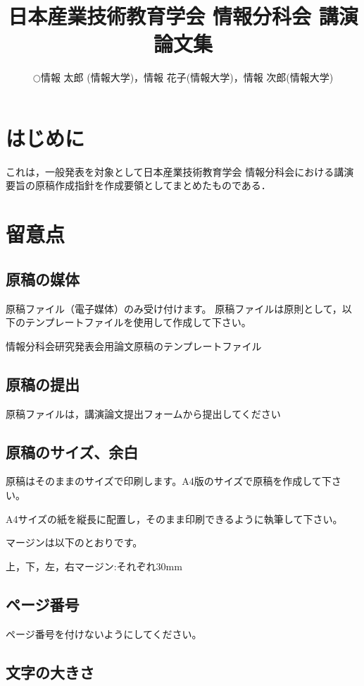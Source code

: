 \documentclass[uplatex, dvipdfmx]{jste-ist}
\title{日本産業技術教育学会 情報分科会 講演論文集}
\author{$\bigcirc$情報 太郎 (情報大学)，情報 花子(情報大学)，情報 次郎(情報大学)}
\begin{document}

\maketitle

\section{はじめに}

これは，一般発表を対象として日本産業技術教育学会 情報分科会における講演要旨の原稿作成指針を作成要領としてまとめたものである．

\section{留意点}

\subsection{原稿の媒体}

原稿ファイル（電子媒体）のみ受け付けます。
原稿ファイルは原則として，以下のテンプレートファイルを使用して作成して下さい。

情報分科会研究発表会用論文原稿のテンプレートファイル


\subsection{原稿の提出}

原稿ファイルは，講演論文提出フォームから提出してください

\subsection{原稿のサイズ、余白}

原稿はそのままのサイズで印刷します。A4版のサイズで原稿を作成して下さい。

A4サイズの紙を縦長に配置し，そのまま印刷できるように執筆して下さい。

マージンは以下のとおりです。

上，下，左，右マージン:それぞれ30mm

\subsection{ページ番号}

ページ番号を付けないようにしてください。

\subsection{文字の大きさ}
\end{document}
